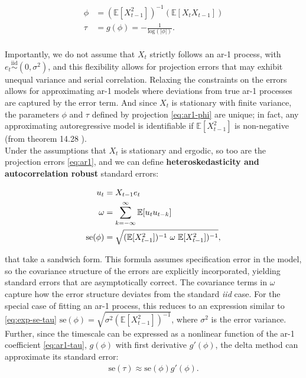 \documentclass[main.tex]{subfiles}
\begin{document}
\begin{align}
    \phi &= (\mathbb{E}[X_{t-1}^2])^{-1}(\mathbb{E}[X_t X_{t-1}]) \label{eq:ar1-phi}\\
    \tau &= g(\phi) = -\frac{1}{\text{log}(|\phi|)}. \label{eq:ar1-tau}
\end{align}
 \\

Importantly, we do not assume that $X_t$ strictly follows an ar-1 process, with $e_t \overset{\text{iid}}{\sim} (0, \sigma^2)$, and this flexibility allows for projection errors that may exhibit unequal variance and serial correlation. Relaxing the constraints on the errors allows for approximating ar-1 models where deviations from true ar-1 processes are captured by the error term. And since $X_t$ is stationary with finite variance, the parameters $\phi$ and $\tau$ defined by projection \eqref{eq:ar1-phi} are unique; in fact, any approximating autoregressive model is identifiable if $\mathbb{E}[X_{t-1}^2]$ is non-negative (from theorem 14.28 \cite{hansen_econometrics_2022}).\\

Under the assumptions that $X_t$ is stationary and ergodic, so too are the projection errors \eqref{eq:ar1}, and we can define \textbf{heteroskedasticity and autocorrelation robust} standard errors:

\begin{align}
    u_t &= X_{t-1} e_t \notag\\
    \omega &= \sum_{k=-\infty}^{\infty} \mathbb{E}[u_t u_{t-k}] \notag\\
    \text{se}(\phi) &= \sqrt{(\mathbb{E}[X_{t-1}^2])^{-1} \hspace{3px} \omega \hspace{3px} \mathbb{E}[X_{t-1}^2])^{-1}}, \label{eq:se-phi}
\end{align}

that take a sandwich form. This formula assumes specification error in the model, so the covariance structure of the errors are explicitly incorporated, yielding standard errors that are asymptotically correct. The covariance terms in $\omega$ capture how the error structure deviates from the standard \textit{iid} case. For the special case of fitting an ar-1 process, this reduces to an expression similar to \eqref{eq:exp-se-tau} $\text{se}(\phi) = \sqrt{\sigma^2 (\mathbb{E}[X_{t-1}^2])^{-1}}$, where $\sigma^2$ is the error variance. \\

Further, since the timescale can be expressed as a nonlinear function of the ar-1 coefficient \eqref{eq:ar1-tau}, $g(\phi)$ with first derivative $g'(\phi)$, the delta method can approximate its standard error:
\begin{align}\label{se-tau}
    \text{se}(\tau) \approx \text{se}(\phi) g'(\phi).
\end{align}
\end{document}
